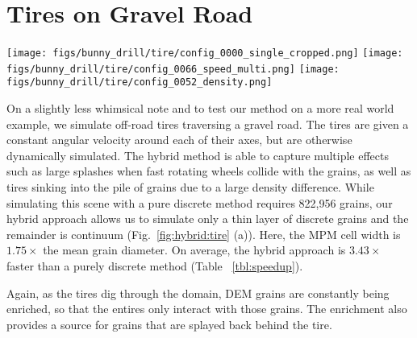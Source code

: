 \section{Tires on Gravel Road}
\begin{center}
  \centering
  \texttt{[image: figs/bunny\_drill/tire/config\_0000\_single\_cropped.png]}
  \texttt{[image: figs/bunny\_drill/tire/config\_0066\_speed\_multi.png]}
  \texttt{[image: figs/bunny\_drill/tire/config\_0052\_density.png]}
  \label{fig:hybrid:tire}
\end{center}
On a slightly less whimsical note and to test our method on a more real world example, we simulate off-road tires traversing a gravel road. The tires are given a constant angular velocity around each of their axes, but are otherwise dynamically simulated. The hybrid method is able to capture multiple effects such as large splashes when fast rotating wheels collide with the grains, as well as tires sinking into the pile of grains due to a large density difference. While simulating this scene with a pure discrete method requires 822,956 grains, our hybrid approach allows us to simulate only a thin layer of discrete grains and the remainder is continuum (Fig.~\ref{fig:hybrid:tire} (a)). Here, the MPM cell width is $1.75\times$ the mean grain diameter. On average, the hybrid approach is $3.43\times$ faster than a purely discrete method (Table ~\ref{tbl:speedup}).

Again, as the tires dig through the domain, DEM grains are constantly being enriched, so that the entires only interact with those grains. The enrichment also provides a source for grains that are splayed back behind the tire.

